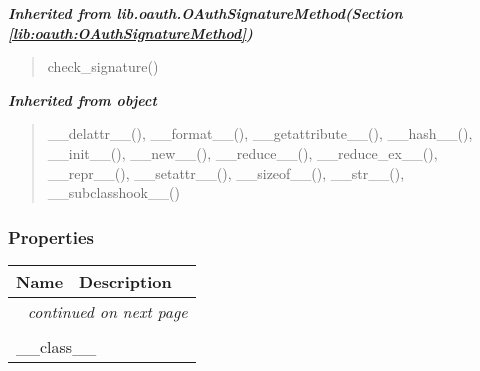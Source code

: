 \large{\textbf{\textit{Inherited from lib.oauth.OAuthSignatureMethod\textit{(Section \ref{lib:oauth:OAuthSignatureMethod})}}}}

\begin{quote}
check\_signature()
\end{quote}

\large{\textbf{\textit{Inherited from object}}}

\begin{quote}
\_\_delattr\_\_(), \_\_format\_\_(), \_\_getattribute\_\_(), \_\_hash\_\_(), \_\_init\_\_(), \_\_new\_\_(), \_\_reduce\_\_(), \_\_reduce\_ex\_\_(), \_\_repr\_\_(), \_\_setattr\_\_(), \_\_sizeof\_\_(), \_\_str\_\_(), \_\_subclasshook\_\_()
\end{quote}


  \subsubsection{Properties}

    \vspace{-1cm}
\hspace{\varindent}\begin{longtable}{|p{\varnamewidth}|p{\vardescrwidth}|l}
\cline{1-2}
\cline{1-2} \centering \textbf{Name} & \centering \textbf{Description}& \\
\cline{1-2}
\endhead\cline{1-2}\multicolumn{3}{r}{\small\textit{continued on next page}}\\\endfoot\cline{1-2}
\endlastfoot\multicolumn{2}{|l|}{\textit{Inherited from object}}\\
\multicolumn{2}{|p{\varwidth}|}{\raggedright \_\_class\_\_}\\
\cline{1-2}
\end{longtable}



